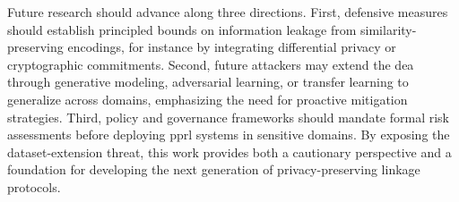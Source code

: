 \documentclass[a4paper,11pt]{scrartcl}
\begin{document}
Future research should advance along three directions. 
First, defensive measures should establish principled bounds on information leakage from similarity-preserving encodings, for instance by integrating differential privacy or cryptographic commitments. 
Second, future attackers may extend the \ac{dea} through generative modeling, adversarial learning, or transfer learning to generalize across domains, emphasizing the need for proactive mitigation strategies. 
Third, policy and governance frameworks should mandate formal risk assessments before deploying \ac{pprl} systems in sensitive domains. 
By exposing the dataset-extension threat, this work provides both a cautionary perspective and a foundation for developing the next generation of privacy-preserving linkage protocols.
\end{document}
